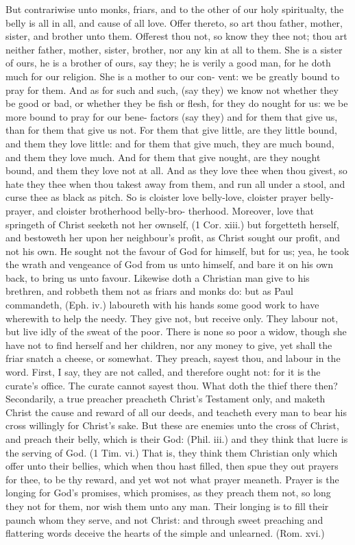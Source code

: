 \documentclass{custom}
\begin{document}
But contrariwise unto monks, friars, and to the other of 
our holy spiritualty, the belly is all in all, and cause of all 
love. Offer thereto, so art thou father, mother, sister, and 
brother unto them. Offerest thou not, so know they thee 
not; thou art neither father, mother, sister, brother, nor 
any kin at all to them. She is a sister of ours, he is a 
brother of ours, say they; he is verily a good man, for he 
doth much for our religion. She is a mother to our con- 
vent: we be greatly bound to pray for them. And as for 
such and such, (say they) we know not whether they be 
good or bad, or whether they be fish or flesh, for they do 
nought for us: we be more bound to pray for our bene- 
factors (say they) and for them that give us, than for them 
that give us not. For them that give little, are they little 
bound, and them they love little: and for them that give 
much, they are much bound, and them they love much. 
And for them that give nought, are they nought bound, 
and them they love not at all. And as they love thee 
when thou givest, so hate they thee when thou takest 
away from them, and run all under a stool, and curse thee 
as black as pitch. So is cloister love belly-love, cloister 
prayer belly-prayer, and cloister brotherhood belly-bro- 
therhood. Moreover, love that springeth of Christ seeketh 
not her ownself, (1 Cor. xiii.) but forgetteth herself, and 
bestoweth her upon her neighbour's profit, as Christ sought 
our profit, and not his own. He sought not the favour of 
God for himself, but for us; yea, he took the wrath and 
vengeance of God from us unto himself, and bare it on his 
own back, to bring us unto favour. Likewise doth a 
Christian man give to his brethren, and robbeth them not 
as friars and monks do: but as Paul commandeth, 
(Eph. iv.) laboureth with his hands some good work to have 
wherewith to help the needy. They give not, but receive 
only. They labour not, but live idly of the sweat of the 
poor. There is none so poor a widow, though she have 
not to find herself and her children, nor any money to give, 
yet shall the friar snatch a cheese, or somewhat. They 
preach, sayest thou, and labour in the word. First, I say, 
they are not called, and therefore ought not: for it is the 
curate's office. The curate cannot sayest thou. What 
doth the thief there then? Secondarily, a true preacher 
preacheth Christ's Testament only, and maketh Christ the 
cause and reward of all our deeds, and teacheth every man 
to bear his cross willingly for Christ's sake. But these 
are enemies unto the cross of Christ, and preach their 
belly, which is their God: (Phil. iii.) and they think that 
lucre is the serving of God. (1 Tim. vi.) That is, they 
think them Christian only which offer unto their bellies, 
which when thou hast filled, then spue they out prayers 
for thee, to be thy reward, and yet wot not what prayer
meaneth. Prayer is the longing for God's promises, 
which promises, as they preach them not, so long they not 
for them, nor wish them unto any man. Their longing is 
to fill their paunch whom they serve, and not Christ: and 
through sweet preaching and flattering words deceive the 
hearts of the simple and unlearned. (Rom. xvi.) 
\end{document}
